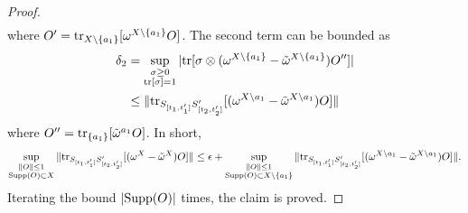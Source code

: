 \documentclass[prx,aps,amsmath,amssymb,floatfix,superscriptaddress,11pt,tightenlines,longbibliography,onecolumn,notitlepage]{revtex4-1}
\newcommand{\Tr}{\textnormal{tr}}
\begin{document}
\begin{proof}
\begin{equation}
\begin{aligned}
    \end{aligned}
  \end{equation}
  where  $O'= \Tr_{X\setminus \{a_1\}}[\omega^{X\setminus\{a_1 \}}O]$. The second term can be bounded as
  \begin{equation}
    \begin{aligned}
      \delta_2 &=  \sup_{\substack{\sigma\geq 0 \\ \Tr[\sigma]=1}}|\Tr[\sigma\otimes(\omega^{X\setminus \{a_1 \}} - \tilde{\omega}^{X\setminus \{a_1 \}})O'']| \\
        &\leq \|\Tr_{S_{[t_1,t_1']}S_{[t_2,t_2']}' }[(\omega^{X\setminus a_1} - \tilde{\omega}^{X\setminus a_1}) O]\|
    \end{aligned}
  \end{equation}
where $O'' = \Tr_{\{a_1\}}[\tilde{\omega}^{a_1} O]$. In short,
\begin{equation}
    \sup_{\substack{\|O \|\leq 1\\ \text{Supp}(O) \subset X}}\|\Tr_{S_{[t_1,t_1']}S_{[t_2,t_2']}'} [(\omega^X - \tilde{\omega}^X)O]\| \leq \epsilon + \sup_{\substack{\|O \|\leq 1 \\ \text{Supp}(O)\subset X\setminus \{a_1\} }} \|\Tr_{S_{[t_1,t_1']}S_{[t_2,t_2']}'}[(\omega^{X\setminus a_1} - \tilde{\omega}^{X\setminus a_1}) O]\|.
  \end{equation}
Iterating the bound $|\textnormal{Supp}(O)|$ times, the claim is proved.
\end{proof}
\end{document}
